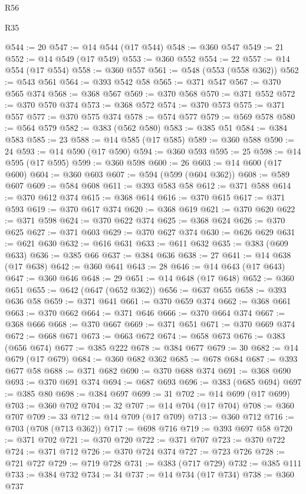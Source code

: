 \begin{lexlean}{R56}
\begin{lexlean}{R35}
\begin{coremodule}
{{{{{{{{{{{{{{{{{{{{{{{{{{{{{{{{{{{{{{{{{{{{{{{{{{{{@544 := 20
@547 := @14 @544 (@17 @544)
@548 := @360 @547
@549 := 21
@552 := @14 @549 (@17 @549)
@553 := @360 @552
@554 := 22
@557 := @14 @554 (@17 @554)
@558 := @360 @557
@561 := @548 (@553 (@558 @362))
@562 := @543 @561
@564 := @393 @542 @58
@565 := @371 @547
@567 := @370 @565 @374
@568 := @368 @567
@569 := @370 @568
@570 := @371 @552
@572 := @370 @570 @374
@573 := @368 @572
@574 := @370 @573
@575 := @371 @557
@577 := @370 @575 @374
@578 := @574 @577
@579 := @569 @578
@580 := @564 @579
@582 := @383 (@562 @580)
@583 := @385 @51
@584 := @384 @583
@585 := 23
@588 := @14 @585 (@17 @585)
@589 := @360 @588
@590 := 24
@593 := @14 @590 (@17 @590)
@594 := @360 @593
@595 := 25
@598 := @14 @595 (@17 @595)
@599 := @360 @598
@600 := 26
@603 := @14 @600 (@17 @600)
@604 := @360 @603
@607 := @594 (@599 (@604 @362))
@608 := @589 @607
@609 := @584 @608
@611 := @393 @583 @58
@612 := @371 @588
@614 := @370 @612 @374
@615 := @368 @614
@616 := @370 @615
@617 := @371 @593
@619 := @370 @617 @374
@620 := @368 @619
@621 := @370 @620
@622 := @371 @598
@624 := @370 @622 @374
@625 := @368 @624
@626 := @370 @625
@627 := @371 @603
@629 := @370 @627 @374
@630 := @626 @629
@631 := @621 @630
@632 := @616 @631
@633 := @611 @632
@635 := @383 (@609 @633)
@636 := @385 @66
@637 := @384 @636
@638 := 27
@641 := @14 @638 (@17 @638)
@642 := @360 @641
@643 := 28
@646 := @14 @643 (@17 @643)
@647 := @360 @646
@648 := 29
@651 := @14 @648 (@17 @648)
@652 := @360 @651
@655 := @642 (@647 (@652 @362))
@656 := @637 @655
@658 := @393 @636 @58
@659 := @371 @641
@661 := @370 @659 @374
@662 := @368 @661
@663 := @370 @662
@664 := @371 @646
@666 := @370 @664 @374
@667 := @368 @666
@668 := @370 @667
@669 := @371 @651
@671 := @370 @669 @374
@672 := @668 @671
@673 := @663 @672
@674 := @658 @673
@676 := @383 (@656 @674)
@677 := @385 @222
@678 := @384 @677
@679 := 30
@682 := @14 @679 (@17 @679)
@684 := @360 @682 @362
@685 := @678 @684
@687 := @393 @677 @58
@688 := @371 @682
@690 := @370 @688 @374
@691 := @368 @690
@693 := @370 @691 @374
@694 := @687 @693
@696 := @383 (@685 @694)
@697 := @385 @80
@698 := @384 @697
@699 := 31
@702 := @14 @699 (@17 @699)
@703 := @360 @702
@704 := 32
@707 := @14 @704 (@17 @704)
@708 := @360 @707
@709 := 33
@712 := @14 @709 (@17 @709)
@713 := @360 @712
@716 := @703 (@708 (@713 @362))
@717 := @698 @716
@719 := @393 @697 @58
@720 := @371 @702
@721 := @370 @720
@722 := @371 @707
@723 := @370 @722
@724 := @371 @712
@726 := @370 @724 @374
@727 := @723 @726
@728 := @721 @727
@729 := @719 @728
@731 := @383 (@717 @729)
@732 := @385 @111
@733 := @384 @732
@734 := 34
@737 := @14 @734 (@17 @734)
@738 := @360 @737
}}}}}}}}}}}}}}}}}}}}}}}}}}}}}}}}}}}}}}}}}}}}}}}}}}}}
\end{coremodule}
\end{lexlean}
\end{lexlean}
